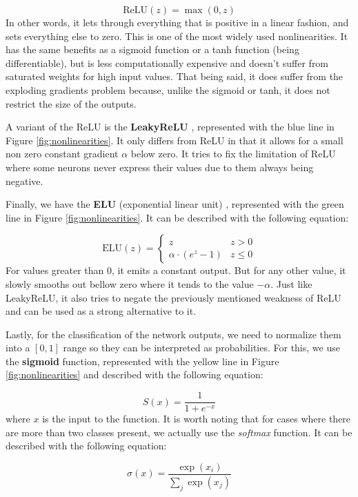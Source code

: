 \documentclass[times, utf8, diplomski, english]{fer_eng}
\begin{document}
\[ \mathrm{ReLU}(z) = \max (0, z) \]
In other words, it lets through everything that is positive in a linear fashion, and sets everything else to zero. This is one of the most widely used nonlinearities. It has the same benefits as a sigmoid function or a tanh function (being differentiable), but is less computationally expensive and doesn't suffer from saturated weights for high input values. That being said, it does suffer from the exploding gradients problem because, unlike the sigmoid or tanh, it does not restrict the size of the outputs.

A variant of the ReLU is the \textbf{LeakyReLU} \cite{leakyrelu}, represented with the blue line in Figure \ref{fig:nonlinearities}. It only differs from ReLU in that it allows for a small non zero constant gradient $\alpha$ below zero. It tries to fix the limitation of ReLU where some neurons never express their values due to them always being negative.

Finally, we have the \textbf{ELU} (exponential linear unit) \cite{elu}, represented with the green line in Figure \ref{fig:nonlinearities}. It can be described with the following equation:

\[ \mathrm{ELU}(z) = \begin{cases} 
z & z > 0 \\
\alpha \cdot (e^z - 1) & z \leq 0
\end{cases} \]
For values greater than 0, it emits a constant output. But for any other value, it slowly smooths out bellow zero where it tends to the value $- \alpha$. Just like LeakyReLU, it also tries to negate the previously mentioned weakness of ReLU and can be used as a strong alternative to it.

Lastly, for the classification of the network outputs, we need to normalize them into a $[0, 1]$ range so they can be interpreted as probabilities. For this, we use the \textbf{sigmoid} function, represented with the yellow line in Figure \ref{fig:nonlinearities} and described with the following equation:

\[ S(x) = \frac{1}{1 + e^{-x}} \]
where $x$ is the input to the function. It is worth noting that for cases where there are more than two classes present, we actually use the \textit{softmax} function. It can be described with the following equation:

\[ \sigma(x) = \frac{\exp (x_i)}{\sum_j \exp (x_j)} \]
\end{document}
